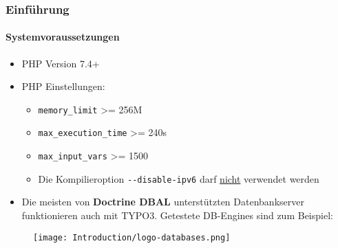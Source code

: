 %

\begin{frame}[fragile]
	\frametitle{Einführung}
	\framesubtitle{Systemvoraussetzungen}

	\begin{itemize}
		\item PHP Version 7.4+
		\item PHP Einstellungen:

			\begin{itemize}
				\item \texttt{memory\_limit} >= 256M
				\item \texttt{max\_execution\_time} >= 240s
				\item \texttt{max\_input\_vars} >= 1500
				\item Die Kompilieroption \texttt{-}\texttt{-disable-ipv6} darf \underline{nicht} verwendet werden
			\end{itemize}

		\item Die meisten von \textbf{Doctrine DBAL} unterstützten Datenbankserver funktionieren auch mit TYPO3.
			Getestete DB-Engines sind zum Beispiel:
	\end{itemize}

	\begin{figure}
		\texttt{[image: Introduction/logo-databases.png]}
	\end{figure}

\end{frame}


